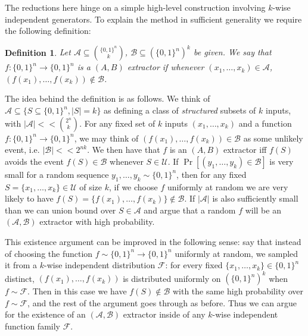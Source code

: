 \documentclass[11pt]{article}
\newtheorem{definition}{Definition}
\newcommand{\B}{\{0,1\}}
\begin{document}
The reductions here hinge on a simple high-level construction involving $k$-wise independent generators. To explain the method in sufficient generality we require the following definition:
\begin{definition}
Let $\mathcal{A} \subseteq \binom{\B^n}{k}$, $\mathcal{B} \subseteq (\B^{n})^k$ be given. We say that $f: \B^n \to \B^n$ is a $(A,B)$ extractor if whenever $(x_1,\ldots,x_k) \in \mathcal{A}$, $(f(x_1),\ldots, f(x_k)) \notin \mathcal{B}$.
\end{definition}
The idea behind the definition is as follows. We think of $\mathcal{A} \subseteq \{S \subseteq \B^n, |S| = k\}$ as defining a class of \emph{structured} subsets of $k$ inputs, with $|\mathcal{A}| << \binom{2^n}{k}$. For any fixed set of $k$ inputs $(x_1,\ldots,x_k)$ and a function $f: \B^n \to \B^n$, we may think of $(f(x_1),\ldots,f(x_k)) \in \mathcal{B}$ as some unlikely event, i.e. $|\mathcal{B}| << 2^{nk}$. We then have that $f$ is an $(A,B)$ extractor iff $f(S)$ avoids the event $f(S) \in \mathcal{B}$ whenever $S \in \mathcal{U}$. If $\Pr[(y_1,\ldots,y_k) \in \mathcal{B}]$ is very small for a random sequence $y_1,\ldots,y_k \sim \B^n$, then for any fixed $S = \{x_1,\ldots,x_k\} \in \mathcal{U}$ of size $k$, if we choose $f$ uniformly at random we are very likely to have $f(S) = \{f(x_1),\ldots,f(x_k)\} \notin \mathcal{B}$. If $|\mathcal{A}|$ is also sufficiently small than we can union bound over $S \in \mathcal{A}$ and argue that a random $f$ will be an $(\mathcal{A},\mathcal{B})$ extractor with high probability. 

This existence argument can be improved in the following sense: say that instead of choosing the function $f \sim \B^n \to \B^n$ uniformly at random, we sampled it from a $k$-wise independent distribution $\mathcal{F}$: for every fixed $\{x_1,\ldots,x_k\} \in \B^n$ distinct, $(f(x_1),\ldots,f(x_k))$ is distributed uniformly on $(\B^{n})^k$ when $f \sim \mathcal{F}$. Then in this case we have $f(S) \notin \mathcal{B}$ with the same high probability over $f \sim \mathcal{F}$, and the rest of the argument goes through as before. Thus we can argue for the existence of an $(\mathcal{A},\mathcal{B})$ extractor inside of any $k$-wise independent function family $\mathcal{F}$.
\end{document}
